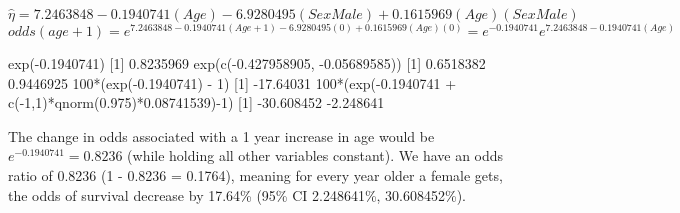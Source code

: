 \documentclass[
]{article}
\newenvironment{Shaded}{\begin{snugshade}}{\end{snugshade}}
\newcommand{\DecValTok}[1]{\textcolor[rgb]{0.00,0.00,0.81}{#1}}
\newcommand{\FloatTok}[1]{\textcolor[rgb]{0.00,0.00,0.81}{#1}}
\newcommand{\FunctionTok}[1]{\textcolor[rgb]{0.00,0.00,0.00}{#1}}
\newcommand{\NormalTok}[1]{#1}
\newcommand{\SpecialCharTok}[1]{\textcolor[rgb]{0.00,0.00,0.00}{#1}}
\begin{document}
\(\hat \eta = 7.2463848 - 0.1940741(Age) - 6.9280495(SexMale) + 0.1615969(Age)(SexMale)\)
\newline
\(odds(age + 1) = e^{7.2463848 - 0.1940741(Age + 1) - 6.9280495(0) + 0.1615969(Age)(0)} = e^{-0.1940741}e^{7.2463848 - 0.1940741(Age)}\)
\newline

\begin{Shaded}
\begin{Highlighting}[]
\FunctionTok{exp}\NormalTok{(}\SpecialCharTok{{-}}\FloatTok{0.1940741}\NormalTok{)}
\NormalTok{[}\DecValTok{1}\NormalTok{] }\FloatTok{0.8235969}
\FunctionTok{exp}\NormalTok{(}\FunctionTok{c}\NormalTok{(}\SpecialCharTok{{-}}\FloatTok{0.427958905}\NormalTok{, }\SpecialCharTok{{-}}\FloatTok{0.05689585}\NormalTok{))}
\NormalTok{[}\DecValTok{1}\NormalTok{] }\FloatTok{0.6518382} \FloatTok{0.9446925}
\DecValTok{100}\SpecialCharTok{*}\NormalTok{(}\FunctionTok{exp}\NormalTok{(}\SpecialCharTok{{-}}\FloatTok{0.1940741}\NormalTok{) }\SpecialCharTok{{-}} \DecValTok{1}\NormalTok{)}
\NormalTok{[}\DecValTok{1}\NormalTok{] }\SpecialCharTok{{-}}\FloatTok{17.64031}
\DecValTok{100}\SpecialCharTok{*}\NormalTok{(}\FunctionTok{exp}\NormalTok{(}\SpecialCharTok{{-}}\FloatTok{0.1940741} \SpecialCharTok{+} \FunctionTok{c}\NormalTok{(}\SpecialCharTok{{-}}\DecValTok{1}\NormalTok{,}\DecValTok{1}\NormalTok{)}\SpecialCharTok{*}\FunctionTok{qnorm}\NormalTok{(}\FloatTok{0.975}\NormalTok{)}\SpecialCharTok{*}\FloatTok{0.08741539}\NormalTok{)}\SpecialCharTok{{-}}\DecValTok{1}\NormalTok{)}
\NormalTok{[}\DecValTok{1}\NormalTok{] }\SpecialCharTok{{-}}\FloatTok{30.608452}  \SpecialCharTok{{-}}\FloatTok{2.248641}
\end{Highlighting}
\end{Shaded}

\newline

The change in odds associated with a 1 year increase in age would be
\(e^{-0.1940741} = 0.8236\) (while holding all other variables
constant). We have an odds ratio of 0.8236 (1 - 0.8236 = 0.1764),
meaning for every year older a female gets, the odds of survival
decrease by 17.64\% (95\% CI 2.248641\%, 30.608452\%).
\end{document}
